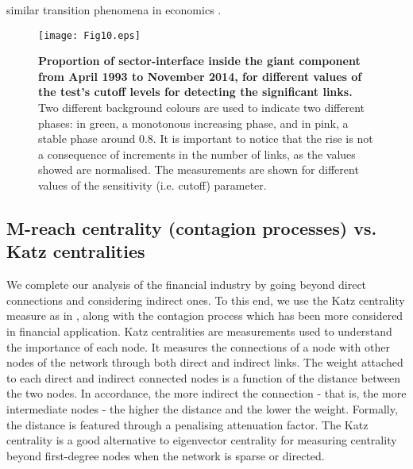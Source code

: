 \documentclass[a4paper,10pt]{article}
\begin{document}
similar transition phenomena in economics \cite{Saracco,Stanley2014}.
\begin{figure}[!h]
\texttt{[image: Fig10.eps]}
\caption{{\bf Proportion of sector-interface inside the giant component from April 1993 to November 2014, for different values of the test\textquoteright s cutoff 
levels for detecting the significant links.} Two different 
background colours are used to indicate two different phases: in green, a monotonous increasing phase, and in pink, a stable
phase around 0.8. It is important to notice that the rise is not a consequence of increments in the number of links, as the
values showed are normalised. The measurements are shown for different values of the sensitivity (i.e. cutoff) parameter.}
\label{fig:10}
\end{figure}
\subsection{M-reach centrality (contagion processes) vs. Katz centralities}
We complete our analysis of  the financial industry by going beyond direct connections and considering indirect ones.  To 
this end, we use the   Katz centrality  measure as in \cite{Cohen}, along with the contagion process which has been more 
considered in financial application. Katz centralities are measurements used to understand the importance of each node. It 
measures the connections of a node with other nodes of the network through both direct and indirect links. The weight attached 
to each direct and indirect connected nodes is a function of the distance between the two nodes. In accordance, the more 
indirect the connection - that is, the more intermediate nodes - the higher the distance and the lower the weight. Formally, 
the distance is featured through a penalising attenuation factor. The Katz centrality is a good alternative to eigenvector 
centrality for measuring centrality beyond first-degree nodes when the network is sparse or directed.
\end{document}
